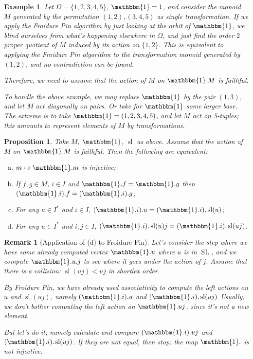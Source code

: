 \documentclass[12pt]{amsart}
\newtheorem{proposition}{Proposition}[section]
\newtheorem{remark}{Remark}[section]
\newtheorem{example}{Example}[section]
\renewcommand{\sl}{\operatorname{sl}}
\newcommand{\SL}{\operatorname{SL}}
\newcommand{\p}{\mathbbm{1}} %
\begin{document}
\begin{example}
  Let $\Omega = \{1,2,3,4,5\}$, $\p =1$, and consider the monoid $M$
  generated by the permutation $(1,2),(3,4,5)$ as single
  transformation. If we apply the Froidure Pin algorithm by just
  looking at the orbit of $\p$, we blind ourselves from what's
  happening elsewhere in $\Omega$, and just find the order $2$ proper
  quotient of $M$ induced by its action on $\{1,2\}$. This is
  equivalent to applying the Froidure Pin algorithm to the
  transformation monoid generated by $(1,2)$, and no contradiction can
  be found.

  Therefore, we need to assume that the action of $M$ on $\p.M$ is
  faithful.

  To handle the above example, we may replace $\p$ by the pair
  $(1,3)$, and let $M$ act diagonally on pairs. Or take for $\p$ some
  larger base. The extreme is to take $\p = (1,2,3,4,5)$, and let $M$
  act on 5-tuples; this amounts to represent elements of $M$ by
  transformations.
\end{example}

\begin{proposition}
  Take $M$, $\p$, $\sl$ as above. Assume that the action of $M$ on
  $\p.M$ is faithful. Then the following are equivalent:
  \begin{enumerate}[(a)]
  \item $m \mapsto \p.m$ is injective;
  \item If $f,g\in M$, $i\in I$ and $\p.f = \p.g$ then
    $(\p.i).f = (\p.i).g$;
  \item For any $u\in I^*$ and $i\in I$, $(\p.i).u = (\p.i).\sl(u)$; %
  \item For any $u\in I^*$ and $i,j\in I$, $(\p.i).\sl(u)j = (\p.i).\sl(uj)$.
  \end{enumerate}
\end{proposition}

\begin{remark}[Application of (d) to Froidure Pin]

  Let's consider the step where we have some already computed vertex
  $\p.u$ where $u$ is in $\SL$, and we compute $\p.u.j$ to see where
  it goes under the action of $j$. Assume that there is a collision:
  $\sl(uj) < uj$ in shortlex order.

  By Froidure Pin, we have already used associativity to compute the
  left actions on $u$ and $\sl(uj)$, namely $(\p.i).u$ and
  $(\p.i).\sl(uj)$ Usually, we don't bother computing the left action
  on $\p.uj$, since it's not a new element.

  But let's do it; namely calculate and compare $(\p.i).uj$ and
  $(\p.i).\sl(uj)$. If they are not equal, then stop: the map $\p.$ is
  not injective.
\end{remark}
\end{document}
